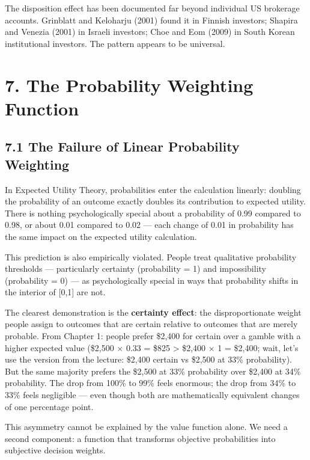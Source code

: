 \documentclass[12pt, letterpaper]{article}
\begin{document}
The disposition effect has been documented far beyond individual US brokerage accounts. Grinblatt and Keloharju (2001) found it in Finnish investors; Shapira and Venezia (2001) in Israeli investors; Choe and Eom (2009) in South Korean institutional investors. The pattern appears to be universal.

\medskip


\section{7. The Probability Weighting Function}



\subsection{7.1 The Failure of Linear Probability Weighting}


In Expected Utility Theory, probabilities enter the calculation linearly: doubling the probability of an outcome exactly doubles its contribution to expected utility. There is nothing psychologically special about a probability of 0.99 compared to 0.98, or about 0.01 compared to 0.02 --- each change of 0.01 in probability has the same impact on the expected utility calculation.

This prediction is also empirically violated. People treat qualitative probability thresholds --- particularly certainty (probability = 1) and impossibility (probability = 0) --- as psychologically special in ways that probability shifts in the interior of [0,1] are not.

The clearest demonstration is the \textbf{certainty effect}: the disproportionate weight people assign to outcomes that are certain relative to outcomes that are merely probable. From Chapter 1: people prefer \$2,400 for certain over a gamble with a higher expected value (\$2,500 $\times$ 0.33 = \$825 > \$2,400 $\times$ 1 = \$2,400; wait, let's use the version from the lecture: \$2,400 certain vs \$2,500 at 33\% probability). But the same majority prefers the \$2,500 at 33\% probability over \$2,400 at 34\% probability. The drop from 100\% to 99\% feels enormous; the drop from 34\% to 33\% feels negligible --- even though both are mathematically equivalent changes of one percentage point.

This asymmetry cannot be explained by the value function alone. We need a second component: a function that transforms objective probabilities into subjective decision weights.
\end{document}
